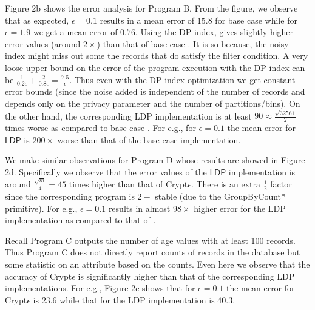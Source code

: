 {Figure 2b shows the error analysis for Program B. From the figure, we observe that as expected, $\epsilon=0.1$ results in a mean error of $15.8$ for base case \system while for $\epsilon=1.9$ we get a mean error of $0.76$. Using the DP index, gives slightly higher error values (around $2\times$) than that of base case \system. It is so because, the noisy index might miss out some the records that do satisfy the filter condition. A very loose upper bound on the error of the program execution with the DP index can be $\frac{1}{0.2\epsilon}+\frac{2}{0.8\epsilon}=\frac{7.5}{\epsilon}$. Thus even with the DP index optimization we get constant error bounds (since the noise added is independent of the number of records and depends only on the privacy parameter and the number of partitions/bins). On the other hand, the corresponding \textsf{LDP} implementation is  at least $90 \approx \frac{\sqrt{32561}}{2}$ times worse as compared to base case \system. For e.g., for $\epsilon=0.1$ the mean error for $\textsf{LDP}$ is $200\times $ worse than that of the base case \system implementation.

We make similar observations for Program D whose results are showed in Figure 2d. Specifically we observe that the error values of the $\textsf{LDP}$ implementation is around $\frac{\sqrt{m}}{4}=45 $ times higher than that of Crypt$\epsilon$. There is an extra $\frac{1}{2}$ factor since  the corresponding \system program is $2-$ stable (due to the \textsf{GroupByCount*} primitive). For e.g., $\epsilon=0.1$ results in almost $98 \times$ higher error for the \textsf{LDP} implementation as compared to that of \system. 

Recall Program C outputs the number of age values with at least 100 records. Thus Program C does not directly report counts of records in the database but some statistic on an attribute based on the counts. Even here we observe that the accuracy of Crypt$\epsilon$ is significantly higher than that of the corresponding \textsf{LDP} implementations. For e.g., Figure 2c shows that for $\epsilon=0.1$ the mean error for Crypt$\epsilon$ is $23.6$ while that for the \textsf{LDP} implementation is $40.3$. 

}
